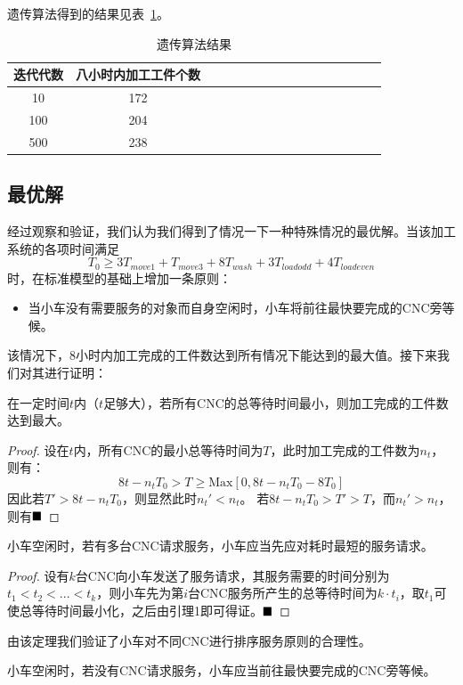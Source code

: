 \documentclass{cumcmthesis}
\begin{document}
	遗传算法得到的结果见表~\ref{table:ga_results}。

	\begin{table}[!htbp]
		\centering
		\caption{遗传算法结果}
		\label{table:ga_results}
		\begin{tabular}{cccccccccccccccc}
	\toprule[1.5pt]
			迭代代数 & 八小时内加工工件个数 \\
	\midrule[1pt]
			10 & 172 \\
			100 & 204 \\
			500 & 238 \\
	\bottomrule[1.5pt]
	\end{tabular}
	\end{table}

	\subsection{最优解}
	经过观察和验证，我们认为我们得到了情况一下一种特殊情况的最优解。当该加工系统的各项时间满足
	\[T_0 \geq 3T_{move 1}+T_{move 3}+8T_{wash}+3T_{load odd}+4T_{load even}\]
	时，在标准模型的基础上增加一条原则：
	\begin{itemize}
		\item 当小车没有需要服务的对象而自身空闲时，小车将前往最快要完成的CNC旁等候。
	\end{itemize}
	该情况下，8小时内加工完成的工件数达到所有情况下能达到的最大值。接下来我们对其进行证明：
	\begin{lemma}
		在一定时间$t$内（$t$足够大），若所有CNC的总等待时间最小，则加工完成的工件数达到最大。
	\end{lemma}
	\begin{proof}
		设在$t$内，所有CNC的最小总等待时间为$T$，此时加工完成的工件数为$n_t$，则有：
		$$8t-n_tT_0>T\geq \textrm{Max}[0, 8t-n_tT_0-8T_0]$$
		因此若$T'>8t-n_tT_0$，则显然此时$n_t'<n_t$。\newline
		若$8t-n_tT_0>T'>T$，而$n_t'>n_t$，则有$\hfill\blacksquare$
	\end{proof}
	\begin{theorem}
		小车空闲时，若有多台CNC请求服务，小车应当先应对耗时最短的服务请求。
	\end{theorem}
	\begin{proof}
		设有$k$台CNC向小车发送了服务请求，其服务需要的时间分别为$t_1<t_2<...<t_k$，则小车先为第$i$台CNC服务所产生的总等待时间为$k\cdot t_i$，取$t_1$可使总等待时间最小化，之后由引理1即可得证。$\hfill\blacksquare$
	\end{proof}
	由该定理我们验证了小车对不同CNC进行排序服务原则的合理性。
	\begin{theorem}
		小车空闲时，若没有CNC请求服务，小车应当前往最快要完成的CNC旁等候。
	\end{theorem}
\end{document}
